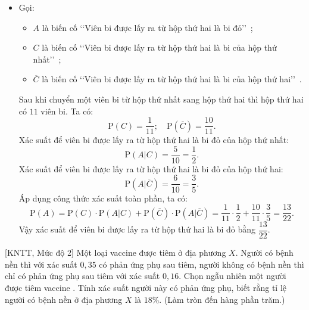\begin{ex}
{\begin{itemize}
\begin{itemchoice}
		Vậy xác suất để viên bi được lấy ra từ hộp thứ hai là bi đỏ bằng $\dfrac{13}{22}$.
		\end{itemchoice}
						\item[Cách 2] Gọi:
			\begin{itemize}
				\item $A$ là biến cố \lq \lq Viên bi được lấy ra từ hộp thứ hai là bi đỏ\rq \rq~;
				\item $C$ là biến cố \lq \lq Viên bi được lấy ra từ hộp thứ hai là bi của hộp thứ nhất\rq \rq~;
				\item $\overline{C}$ là biến cố \lq \lq Viên bi được lấy ra từ hộp thứ hai là bi của hộp thứ hai\rq \rq~.
			\end{itemize}
			Sau khi chuyển một viên bi từ hộp thứ nhất sang hộp thứ hai thì hộp thứ hai có $11$ viên bi. Ta có: 
			$$\mathrm{P}(C)=\dfrac{1}{11};\quad \mathrm{P}(\overline{C})=\dfrac{10}{11}.$$
			Xác suất để viên bi được lấy ra từ hộp thứ hai là bi đỏ của hộp thứ nhất: 
			$$\mathrm{P}(A|C)=\dfrac{5}{10}=\dfrac{1}{2}.$$
			Xác suất để viên bi được lấy ra từ hộp thứ hai là bi đỏ của hộp thứ hai: 
			$$\mathrm{P}(A|\overline{C})=\dfrac{6}{10}=\dfrac{3}{5}.$$
			Áp dụng công thức xác suất toàn phần, ta có:
			$$\mathrm{P}(A) = \mathrm{P}(C)\cdot \mathrm{P}(A|C) + \mathrm{P}(\overline{C})\cdot \mathrm{P}(A|\overline{C}) =\dfrac{1}{11}\cdot \dfrac{1}{2}+\dfrac{10}{11}\cdot \dfrac{3}{5}=\dfrac{13}{22}.$$
			Vậy xác suất để viên bi được lấy ra từ hộp thứ hai là bi đỏ bằng $\dfrac{13}{22}$.
		\end{itemize}
	}
\end{ex}

\begin{bt}%
[KNTT, Mức độ 2]%
	Một loại vaccine được tiêm ở địa phương $X$. Người có bệnh nền thì với xác suất $0{,}35$ có phản ứng phụ sau tiêm, người không có bệnh nền thì chỉ có phản ứng phụ sau tiêm với xác suất $0{,}16$. Chọn ngẫu nhiên một người được tiêm vaccine . Tính xác suất người này có phản ứng phụ, biết rằng tỉ lệ người có bệnh nền ở địa phương $X$ là $18\%$. (Làm  tròn đến hàng phần trăm.) 
\end{bt}

